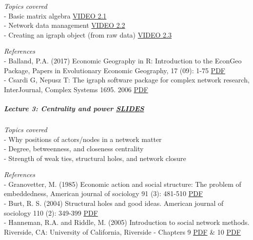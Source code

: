 \documentclass[
]{article}
\begin{document}
\emph{Topics covered}\\
- Basic matrix algebra
\href{https://www.youtube.com/watch?v=cac1yqxxwWM\&feature=youtu.be}{VIDEO
2.1}\\
- Network data management
\href{https://www.youtube.com/watch?v=TAojsuvZRsI\&feature=youtu.be}{VIDEO
2.2}\\
- Creating an igraph object (from raw data)
\href{https://www.youtube.com/watch?v=gRkCgIejXCI}{VIDEO 2.3}

\emph{References}\\
- Balland, P.A. (2017) Economic Geography in R: Introduction to the
EconGeo Package, Papers in Evolutionary Economic Geography, 17 (09):
1-75
\href{https://peeg.wordpress.com/2017/05/09/17-09-economic-geography-in-r-introduction-to-the-econgeo-package/}{PDF}\\
- Csardi G, Nepusz T: The igraph software package for complex network
research, InterJournal, Complex Systems 1695. 2006
\href{http://www.necsi.edu/events/iccs6/papers/c1602a3c126ba822d0bc4293371c.pdf}{PDF}

\hypertarget{lecture-3-centrality-and-power-slides}{%
\subparagraph{\texorpdfstring{\textbf{Lecture 3: Centrality and power}
\href{https://github.com/PABalland/PABalland.github.io/raw/master/teaching/on/L3.pdf}{SLIDES}}{Lecture 3: Centrality and power SLIDES}}\label{lecture-3-centrality-and-power-slides}}

\emph{Topics covered}\\
- Why positions of actors/nodes in a network matter\\
- Degree, betweenness, and closeness centrality\\
- Strength of weak ties, structural holes, and network closure

\emph{References}\\
- Granovetter, M. (1985) Economic action and social structure: The
problem of embeddedness, American journal of sociology 91 (3): 481-510
\href{https://2c2e773f-85c0-4039-818c-ea517fc75085.filesusr.com/ugd/c5611b_0c0ac97925d74aaa914141a15b3bd734.pdf}{PDF}\\
- Burt, R. S. (2004) Structural holes and good ideas. American journal
of sociology 110 (2): 349-399
\href{http://www.econ.upf.edu/docs/seminars/burt.pdf}{PDF}\\
- Hanneman, R.A. and Riddle, M. (2005) Introduction to social network
methods. Riverside, CA: University of California, Riverside - Chapters 9
\href{http://faculty.ucr.edu/~hanneman/nettext/C9_Ego_networks.html}{PDF}
\& 10
\href{http://faculty.ucr.edu/~hanneman/nettext/C10_Centrality.html}{PDF}
\end{document}
